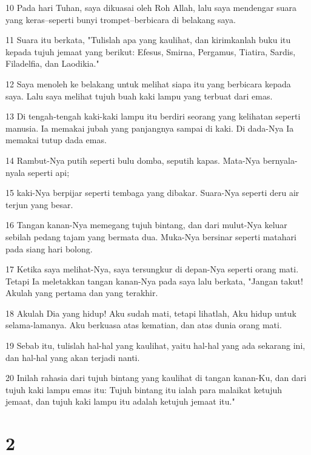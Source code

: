 \par 10 Pada hari Tuhan, saya dikuasai oleh Roh Allah, lalu saya mendengar suara yang keras--seperti bunyi trompet--berbicara di belakang saya.
\par 11 Suara itu berkata, "Tulislah apa yang kaulihat, dan kirimkanlah buku itu kepada tujuh jemaat yang berikut: Efesus, Smirna, Pergamus, Tiatira, Sardis, Filadelfia, dan Laodikia."
\par 12 Saya menoleh ke belakang untuk melihat siapa itu yang berbicara kepada saya. Lalu saya melihat tujuh buah kaki lampu yang terbuat dari emas.
\par 13 Di tengah-tengah kaki-kaki lampu itu berdiri seorang yang kelihatan seperti manusia. Ia memakai jubah yang panjangnya sampai di kaki. Di dada-Nya Ia memakai tutup dada emas.
\par 14 Rambut-Nya putih seperti bulu domba, seputih kapas. Mata-Nya bernyala-nyala seperti api;
\par 15 kaki-Nya berpijar seperti tembaga yang dibakar. Suara-Nya seperti deru air terjun yang besar.
\par 16 Tangan kanan-Nya memegang tujuh bintang, dan dari mulut-Nya keluar sebilah pedang tajam yang bermata dua. Muka-Nya bersinar seperti matahari pada siang hari bolong.
\par 17 Ketika saya melihat-Nya, saya tersungkur di depan-Nya seperti orang mati. Tetapi Ia meletakkan tangan kanan-Nya pada saya lalu berkata, "Jangan takut! Akulah yang pertama dan yang terakhir.
\par 18 Akulah Dia yang hidup! Aku sudah mati, tetapi lihatlah, Aku hidup untuk selama-lamanya. Aku berkuasa atas kematian, dan atas dunia orang mati.
\par 19 Sebab itu, tulislah hal-hal yang kaulihat, yaitu hal-hal yang ada sekarang ini, dan hal-hal yang akan terjadi nanti.
\par 20 Inilah rahasia dari tujuh bintang yang kaulihat di tangan kanan-Ku, dan dari tujuh kaki lampu emas itu: Tujuh bintang itu ialah para malaikat ketujuh jemaat, dan tujuh kaki lampu itu adalah ketujuh jemaat itu."

\chapter{2}

